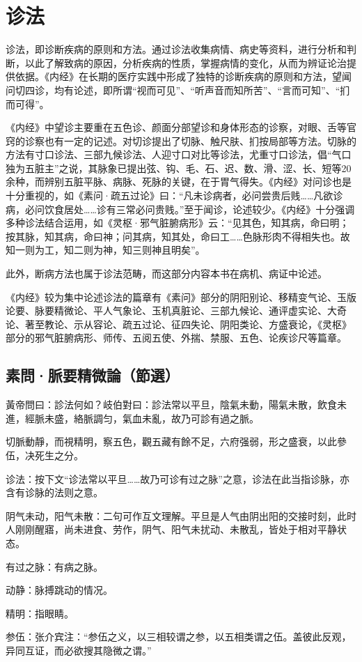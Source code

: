 \documentclass[12pt]{ctexbook}
\begin{document}
\pagestyle{main2}
\fi
\chapter{诊法}%

诊法，即诊断疾病的原则和方法。通过诊法收集病情、病史等资料，进行分析和判断，以此了解致病的原因，分析疾病的性质，掌握病情的变化，从而为辨证论治提供依据。《内经》在长期的医疗实践中形成了独特的诊断疾病的原则和方法，望闻问切四诊，均有论述，即所谓“视而可见”、“听声音而知所苦”、“言而可知”、“扪而可得”。

《内经》中望诊主要重在五色诊、颜面分部望诊和身体形态的诊察，对眼、舌等官窍的诊察也有一定的记述。对切诊提出了切脉、触尺肤、扪按局部等方法。切脉的方法有寸口诊法、三部九候诊法、人迎寸口对比等诊法，尤重寸口诊法，倡“气口独为五脏主”之说，其脉象已提出弦、钩、毛、石、迟、数、滑、涩、长、短等20余种，而辨别五脏平脉、病脉、死脉的关键，在于胃气得失。《内经》对问诊也是十分重视的，如《素问·疏五过论》曰：“凡未诊病者，必问尝贵后贱……凡欲诊病，必问饮食居处……诊有三常必问贵贱。”至于闻诊，论述较少。《内经》十分强调多种诊法结合运用，如《灵枢·邪气脏腑病形》云：“见其色，知其病，命曰明；按其脉，知其病，命曰神；问其病，知其处，命曰工……色脉形肉不得相失也。故知一则为工，知二则为神，知三则神且明矣”。

此外，断病方法也属于诊法范畴，而这部分内容本书在病机、病证中论述。

《内经》较为集中论述诊法的篇章有《素问》部分的阴阳别论、移精变气论、玉版论要、脉要精微论、平人气象论、玉机真脏论、三部九候论、通评虚实论、大奇论、著至教论、示从容论、疏五过论、征四失论、阴阳类论、方盛衰论，《灵枢》部分的邪气脏腑病形、师传、五阅五使、外揣、禁服、五色、论疾诊尺等篇章。

\section{素問·脈要精微論（節選）}%


\begin{yuanwen}
黃帝問曰：診法何如？岐伯對曰：診法常以平旦，陰氣未動，陽氣未散，飲食未進，經脈未盛，絡脈調匀，氣血未亂，故乃可診有過之脈。

切脈動靜，而視精明，察五色，觀五藏有餘不足，六府强弱，形之盛衰，以此參伍，决死生之分。
\end{yuanwen}


\begin{jiaozhu}
	\item 诊法：按下文“诊法常以平旦……故乃可诊有过之脉”之意，诊法在此当指诊脉，亦含有诊脉的法则之意。
	\item 阴气未动，阳气未散：二句可作互文理解。平旦是人气由阴出阳的交接时刻，此时人刚刚醒寤，尚未进食、劳作，阴气、阳气未扰动、未散乱，皆处于相对平静状态。
	\item 有过之脉：有病之脉。
	\item 动静：脉搏跳动的情况。
	\item 精明：指眼睛。
	\item 参伍：张介宾注：“参伍之义，以三相较谓之参，以五相类谓之伍。盖彼此反观，异同互证，而必欲搜其隐微之谓。”
\end{jiaozhu}
\end{document}
